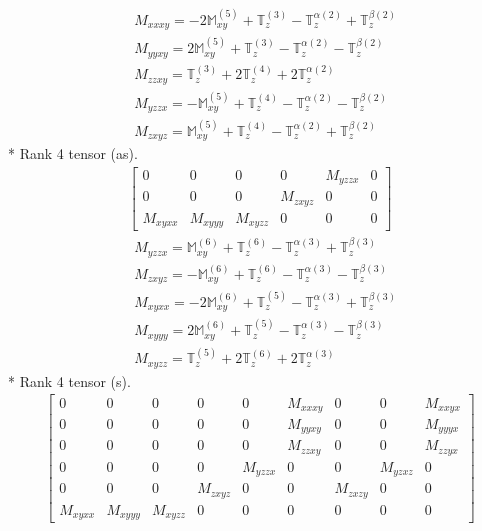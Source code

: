 \documentclass[fleqn,8pt,landscape]{jsarticle}
\begin{document}
\begin{align*}
& M_{xxxy} = - 2 \mathbb{M}_{xy}^{(5)} + \mathbb{T}_{z}^{(3)} - \mathbb{T}_{z}^{\alpha(2)} + \mathbb{T}_{z}^{\beta(2)} \\
& M_{yyxy} = 2 \mathbb{M}_{xy}^{(5)} + \mathbb{T}_{z}^{(3)} - \mathbb{T}_{z}^{\alpha(2)} - \mathbb{T}_{z}^{\beta(2)} \\
& M_{zzxy} = \mathbb{T}_{z}^{(3)} + 2 \mathbb{T}_{z}^{(4)} + 2 \mathbb{T}_{z}^{\alpha(2)} \\
& M_{yzzx} = - \mathbb{M}_{xy}^{(5)} + \mathbb{T}_{z}^{(4)} - \mathbb{T}_{z}^{\alpha(2)} - \mathbb{T}_{z}^{\beta(2)} \\
& M_{zxyz} = \mathbb{M}_{xy}^{(5)} + \mathbb{T}_{z}^{(4)} - \mathbb{T}_{z}^{\alpha(2)} + \mathbb{T}_{z}^{\beta(2)}
\end{align*}
* Rank 4 tensor (as).
\begin{align*}
\begin{bmatrix} 0 & 0 & 0 & 0 & M_{yzzx} & 0 \\ 0 & 0 & 0 & M_{zxyz} & 0 & 0 \\ M_{xyxx} & M_{xyyy} & M_{xyzz} & 0 & 0 & 0 \end{bmatrix}
\end{align*}
\begin{align*}
& M_{yzzx} = \mathbb{M}_{xy}^{(6)} + \mathbb{T}_{z}^{(6)} - \mathbb{T}_{z}^{\alpha(3)} + \mathbb{T}_{z}^{\beta(3)} \\
& M_{zxyz} = - \mathbb{M}_{xy}^{(6)} + \mathbb{T}_{z}^{(6)} - \mathbb{T}_{z}^{\alpha(3)} - \mathbb{T}_{z}^{\beta(3)} \\
& M_{xyxx} = - 2 \mathbb{M}_{xy}^{(6)} + \mathbb{T}_{z}^{(5)} - \mathbb{T}_{z}^{\alpha(3)} + \mathbb{T}_{z}^{\beta(3)} \\
& M_{xyyy} = 2 \mathbb{M}_{xy}^{(6)} + \mathbb{T}_{z}^{(5)} - \mathbb{T}_{z}^{\alpha(3)} - \mathbb{T}_{z}^{\beta(3)} \\
& M_{xyzz} = \mathbb{T}_{z}^{(5)} + 2 \mathbb{T}_{z}^{(6)} + 2 \mathbb{T}_{z}^{\alpha(3)}
\end{align*}
* Rank 4 tensor (s).
\begin{align*}
\begin{bmatrix} 0 & 0 & 0 & 0 & 0 & M_{xxxy} & 0 & 0 & M_{xxyx} \\ 0 & 0 & 0 & 0 & 0 & M_{yyxy} & 0 & 0 & M_{yyyx} \\ 0 & 0 & 0 & 0 & 0 & M_{zzxy} & 0 & 0 & M_{zzyx} \\ 0 & 0 & 0 & 0 & M_{yzzx} & 0 & 0 & M_{yzxz} & 0 \\ 0 & 0 & 0 & M_{zxyz} & 0 & 0 & M_{zxzy} & 0 & 0 \\ M_{xyxx} & M_{xyyy} & M_{xyzz} & 0 & 0 & 0 & 0 & 0 & 0 \end{bmatrix}
\end{align*}
\end{document}
